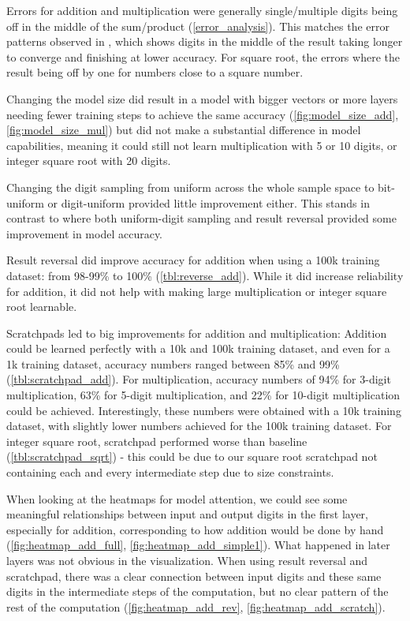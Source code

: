 Errors for addition and multiplication were generally single/multiple digits being off in the middle of the sum/product (\cref{error_analysis}). This matches the error patterns observed in , which shows digits in the middle of the result taking longer to converge and finishing at lower accuracy.
For square root, the errors where the result being off by one for numbers close to a square number.

Changing the model size did result in a model with bigger vectors or more layers needing fewer training steps to achieve the same accuracy (\cref{fig:model_size_add}, \cref{fig:model_size_mul}) but did not make a substantial difference in model capabilities, meaning it could still not learn multiplication with 5 or 10 digits, or integer square root with 20 digits.

Changing the digit sampling from uniform across the whole sample space to bit-uniform or digit-uniform provided little improvement either. This stands in contrast to \cite{positionmatters} where both uniform-digit sampling and result reversal provided some improvement in model accuracy.

Result reversal did improve accuracy for addition when using a 100k training dataset: from 98-99\% to 100\% (\cref{tbl:reverse_add}). While it did increase reliability for addition, it did not help with making large multiplication or integer square root learnable.

Scratchpads led to big improvements for addition and multiplication: Addition could be learned perfectly with a 10k and 100k training dataset, and even for a 1k training dataset, accuracy numbers ranged between 85\% and 99\% (\cref{tbl:scratchpad_add}). For multiplication, accuracy numbers of 94\% for 3-digit multiplication, 63\% for 5-digit multiplication, and 22\% for 10-digit multiplication could be achieved. Interestingly, these numbers were obtained with a 10k training dataset, with slightly lower numbers achieved for the 100k training dataset. For integer square root, scratchpad performed worse than baseline (\cref{tbl:scratchpad_sqrt}) - this could be due to our square root scratchpad not containing each and every intermediate step due to size constraints.

When looking at the heatmaps for model attention, we could see some meaningful relationships between input and output digits in the first layer, especially for addition, corresponding to how addition would be done by hand (\cref{fig:heatmap_add_full}, \cref{fig:heatmap_add_simple1}). What happened in later layers was not obvious in the visualization. When using result reversal and scratchpad, there was a clear connection between input digits and these same digits in the intermediate steps of the computation, but no clear pattern of the rest of the computation (\cref{fig:heatmap_add_rev}, \cref{fig:heatmap_add_scratch}).

